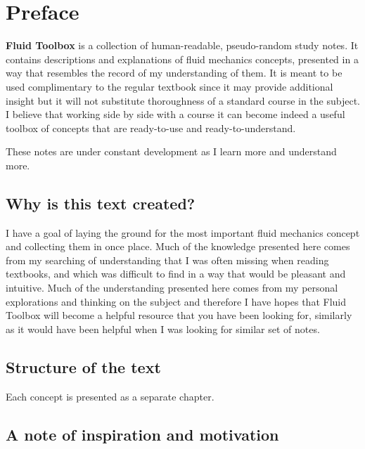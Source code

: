 \documentclass[10pt]{report}
\begin{document}
\setlength{\parskip}{0.6em}
\setlength{\parindent}{0cm}

\tableofcontents

\chapter*{Preface}



\textbf{Fluid Toolbox } is a collection of human-readable, pseudo-random study notes. It contains descriptions and explanations of fluid mechanics concepts, presented in a way that resembles the record of my understanding of them. It is meant to be used complimentary to the regular textbook since it may provide additional insight but it will not substitute thoroughness of a standard course in the subject. I believe that working side by side with a course it can become indeed a useful toolbox of concepts that are ready-to-use and ready-to-understand.

These notes are under constant development as I learn more and understand more.

\section*{Why is this text created?}

I have a goal of laying the ground for the most important fluid mechanics concept and collecting them in once place. Much of the knowledge presented here comes from my searching of understanding that I was often missing when reading textbooks, and which was difficult to find in a way that would be pleasant and intuitive. Much of the understanding presented here comes from my personal explorations and thinking on the subject and therefore I have hopes that Fluid Toolbox will become a helpful resource that you have been looking for, similarly as it would have been helpful when I was looking for similar set of notes.

\section*{Structure of the text}

Each concept is presented as a separate chapter.

\section*{A note of inspiration and motivation}
\end{document}
